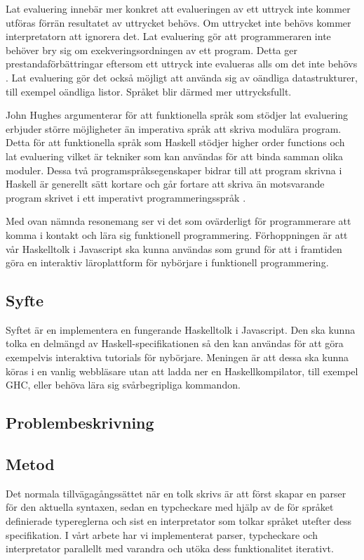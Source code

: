 Lat evaluering innebär mer konkret att evalueringen av ett uttryck inte kommer utföras förrän resultatet av uttrycket behövs. Om uttrycket inte behövs  kommer interpretatorn att ignorera det. 
Lat evaluering gör att programmeraren inte behöver bry sig om exekveringsordningen av ett program. Detta ger prestandaförbättringar eftersom ett uttryck inte evalueras alls om det inte behövs \citep{hudak89}.
Lat evaluering gör det också möjligt att använda sig av oändliga datastrukturer, till exempel oändliga listor. Språket blir därmed mer uttrycksfullt. 

John Hughes argumenterar för att  funktionella språk som stödjer lat evaluering erbjuder större möjligheter än imperativa språk att skriva modulära program. Detta för att funktionella språk som Haskell stödjer higher order functions och lat evaluering vilket är tekniker som kan användas för att binda samman olika moduler.
Dessa två programspråksegenskaper bidrar till att program skrivna i Haskell är generellt sätt kortare och går fortare att skriva än motsvarande program skrivet i ett imperativt programmeringsspråk  \citep{why}.

Med ovan nämnda resonemang ser vi det som ovärderligt för programmerare att komma i kontakt och lära sig funktionell programmering. 
Förhoppningen är att vår Haskelltolk i Javascript ska kunna användas som grund för att i framtiden göra en interaktiv läroplattform för nybörjare i funktionell programmering. 


\subsection{Syfte}
Syftet är en implementera en fungerande Haskelltolk i Javascript. Den ska kunna tolka en delmängd av Haskell-specifikationen så den kan användas för att göra exempelvis interaktiva tutorials för nybörjare.
Meningen är att dessa ska kunna köras i en vanlig webbläsare utan att ladda ner en Haskellkompilator, till exempel GHC, eller behöva lära sig svårbegripliga kommandon.

\subsection{Problembeskrivning} 

\subsection{Metod}
Det normala tillvägagångssättet när en tolk skrivs är att först
skapar en parser för den aktuella syntaxen, sedan en typcheckare med 
hjälp av de för språket definierade typereglerna och sist en interpretator
som tolkar språket utefter dess specifikation. I vårt arbete har vi implementerat parser, typcheckare och interpretator parallellt med varandra och utöka dess funktionalitet iterativt.

